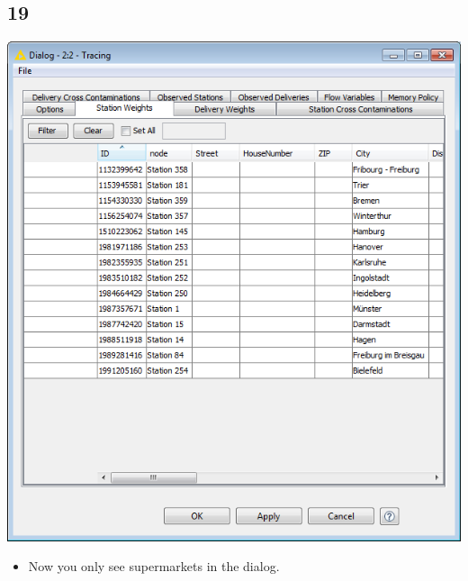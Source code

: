 \documentclass{beamer}
\begin{document}
\subsection{19}
\begin{frame}
	\begin{center}
  		\includegraphics[height=0.6\textheight]{19.png}
	\end{center}
	\begin{itemize}
		\item Now you only see supermarkets in the dialog.
	\end{itemize}
\end{frame}
\end{document}
